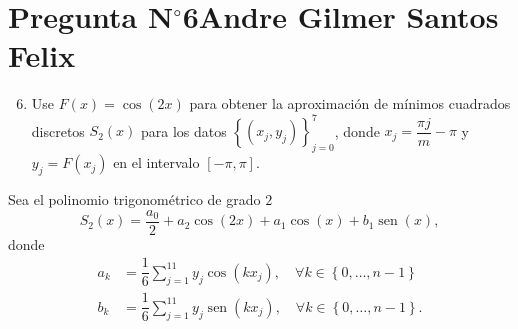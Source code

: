 \section{Pregunta N$^{\circ}$6\qquad Andre Gilmer Santos Felix}

\begin{frame}
    \begin{enumerate}\setcounter{enumi}{5}
        \item

              Use
              \begin{math}
                  F\left(x\right)=
                  \cos\left(2x\right)
              \end{math}
              para obtener la aproximación de mínimos cuadrados
              discretos
              \begin{math}
                  S_{2}\left(x\right)
              \end{math}
              para los datos
              \begin{math}
                  \left\{
                  \left(x_{j},y_{j}\right)
                  \right\}_{j=0}^{7}
              \end{math},
              donde
              \begin{math}
                  x_{j}=
                  \dfrac{\pi j}{m}-
                  \pi
              \end{math}
              y
              \begin{math}
                  y_{j}=
                  F\left(x_{j}\right)
              \end{math}
              en el intervalo
              \begin{math}
                  \left[
                      -\pi,
                      \pi
                      \right]
              \end{math}.
    \end{enumerate}

    \begin{solution}
        Sea el polinomio trigonométrico de grado $2$
        \begin{equation*}
            S_{2}\left(x\right)=
            \dfrac{a_{0}}{2}+
            a_{2}\cos(2x)+
            a_{1}\cos\left(x\right)+
            b_{1}\operatorname{sen}\left(x\right),
        \end{equation*}
        donde
        \begin{align*}
            a_{k} & =
            \dfrac{1}{6}
            \sum_{j=1}^{11}
            y_{j}\cos\left(kx_{j}\right),\quad
            \forall k\in\left\{0,\dotsc,n-1\right\} \\
            b_{k} & =
            \dfrac{1}{6}
            \sum_{j=1}^{11}
            y_{j}
            \operatorname{sen}\left(kx_{j}\right),\quad
            \forall k\in\left\{0,\dotsc,n-1\right\}.
        \end{align*}
    \end{solution}
\end{frame}